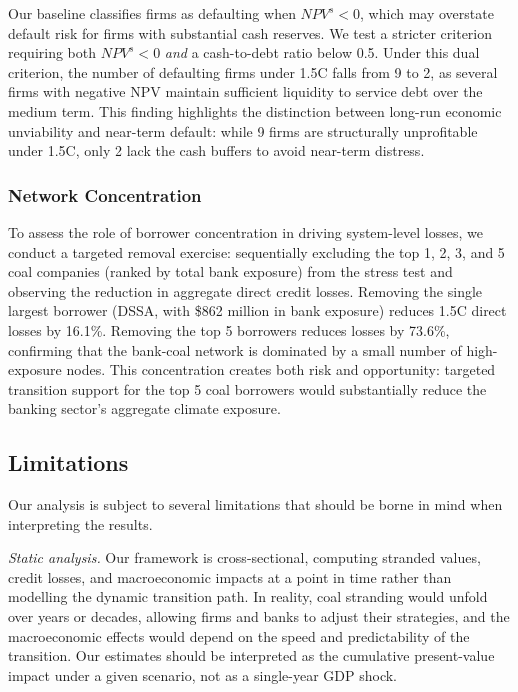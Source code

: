 Our baseline classifies firms as defaulting when $NPV^s < 0$, which may overstate default risk for firms with substantial cash reserves. We test a stricter criterion requiring both $NPV^s < 0$ \textit{and} a cash-to-debt ratio below 0.5. Under this dual criterion, the number of defaulting firms under 1.5\textdegree C falls from 9 to 2, as several firms with negative NPV maintain sufficient liquidity to service debt over the medium term. This finding highlights the distinction between long-run economic unviability and near-term default: while 9 firms are structurally unprofitable under 1.5\textdegree C, only 2 lack the cash buffers to avoid near-term distress.

\subsubsection{Network Concentration}

To assess the role of borrower concentration in driving system-level losses, we conduct a targeted removal exercise: sequentially excluding the top 1, 2, 3, and 5 coal companies (ranked by total bank exposure) from the stress test and observing the reduction in aggregate direct credit losses. Removing the single largest borrower (DSSA, with \$862 million in bank exposure) reduces 1.5\textdegree C direct losses by 16.1\%. Removing the top 5 borrowers reduces losses by 73.6\%, confirming that the bank-coal network is dominated by a small number of high-exposure nodes. This concentration creates both risk and opportunity: targeted transition support for the top 5 coal borrowers would substantially reduce the banking sector's aggregate climate exposure.

\subsection{Limitations}
\label{subsec:limitations}

Our analysis is subject to several limitations that should be borne in mind when interpreting the results.

\textit{Static analysis.} Our framework is cross-sectional, computing stranded values, credit losses, and macroeconomic impacts at a point in time rather than modelling the dynamic transition path. In reality, coal stranding would unfold over years or decades, allowing firms and banks to adjust their strategies, and the macroeconomic effects would depend on the speed and predictability of the transition. Our estimates should be interpreted as the cumulative present-value impact under a given scenario, not as a single-year GDP shock.

